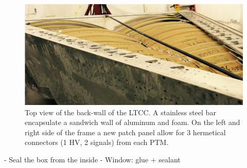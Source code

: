 \begin{figure}[hbt]
	\centering
	\includegraphics[width=1.0\columnwidth,keepaspectratio]{img/spine.png}
	\caption{Top view of the back-wall of the LTCC. A stainless steel bar encapsulate a sandwich wall of aluminum and foam. On the left and right side
            of the frame a new patch panel allow for 3 hermetical connectors (1 HV, 2 signals) from each PTM. }
	\label{fig:spine}
\end{figure}


- Seal the box from the inside
- Window: glue + sealant




